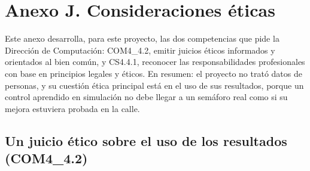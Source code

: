 \section*{Anexo J. Consideraciones éticas}
{}
\label{anexo:etica}
\setcounter{table}{0}
\renewcommand{\thetable}{J.\arabic{table}}
\renewcommand{\theHtable}{J.\arabic{table}}

Este anexo desarrolla, para este proyecto, las dos competencias que pide
la Dirección de Computación: COM4\_4.2, emitir juicios éticos
informados y orientados al bien común, y CS4.4.1, reconocer las
responsabilidades profesionales con base en principios legales y
éticos. En resumen: el proyecto no trató datos de personas, y su
cuestión ética principal está en el uso de sus resultados, porque un
control aprendido en simulación no debe llegar a un semáforo real como
si su mejora estuviera probada en la calle.

\subsection*{Un juicio ético sobre el uso de los resultados (COM4\_4.2)}

